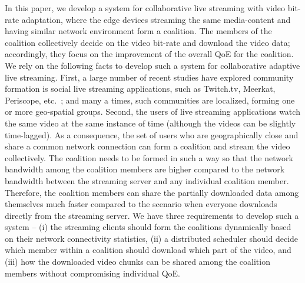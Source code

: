 In this paper, we develop a system for collaborative live streaming with video bit-rate adaptation, where the edge devices streaming the same media-content and having similar network environment form a coalition. The members of the coalition collectively decide on the video bit-rate and download the video data; accordingly, they focus on the improvement of the overall QoE for the coalition.  We rely on the following facts to develop such a system for collaborative adaptive live streaming. First, a large number of recent studies have explored community formation is social live streaming applications, such as Twitch.tv, Meerkat, Periscope, etc.~\cite{weisz2007watching,hamilton2014streaming,pellicone2017game}; and many a times, such communities are localized, forming one or more geo-spatial groups. Second, the users of live streaming applications watch the same video at the same instance of time (although the videos can be slightly time-lagged). As a consequence, the set of users who are geographically close and share a common network connection can form a coalition and stream the video collectively. The coalition needs to be formed in such a way so that the network bandwidth among the coalition members are higher compared to the network bandwidth between the streaming server and any individual coalition member. Therefore, the coalition members can share the partially downloaded data among themselves much faster compared to the scenario when everyone downloads directly from the streaming server. We have three requirements to develop such a system -- (i) the streaming clients should form the coalitions dynamically based on their network connectivity statistics, (ii) a distributed scheduler should decide which member within a coalition should download which part of the video, and (iii) how the downloaded video chunks can be shared among the coalition members without compromising individual QoE. 

